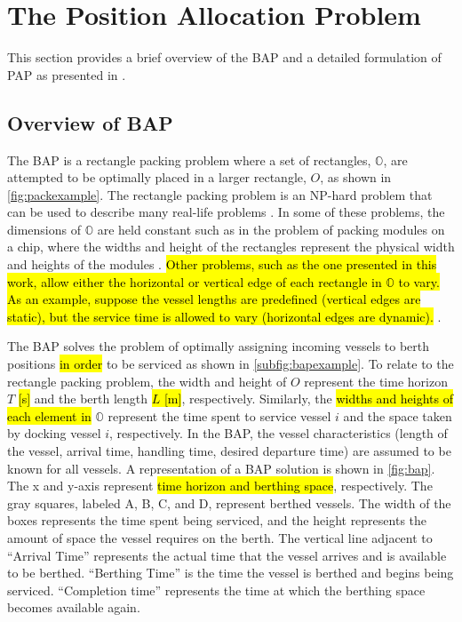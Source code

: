 \documentclass[utf8]{FrontiersinHarvard}
\let\cite\citep                                       %
\begin{document}
\section{The Position Allocation Problem}
\label{sec:the-position-allocation-problem}
This section provides a brief overview of the BAP and a detailed formulation of PAP as presented in
\cite{qarebagh-2019-optim-sched}.

\subsection{Overview of BAP}
\label{sec:overview-of-bap}
The BAP is a rectangle packing problem where a set of rectangles, \(\mathbb{O}\), are attempted to be optimally placed in
a larger rectangle, \(O\), as shown in \autoref{fig:packexample}. The rectangle packing problem is an NP-hard problem that
can be used to describe many real-life problems \cite{bruin-2013-rectan-packin,murata-1995-rectan}. In some of these
problems, the dimensions of \(\mathbb{O}\) are held constant such as in the problem of packing modules on a chip, where
the widths and height of the rectangles represent the physical width and heights of the modules
\cite{murata-1995-rectan}. \hl{Other problems, such as the one presented in this work, allow either the horizontal or vertical edge of each rectangle in $\mathbb{O}$ to vary. As an example, suppose the vessel lengths are predefined (vertical edges are static), but the service time is allowed to vary (horizontal edges are dynamic).}
\cite{buhrkal-2011-model-discr}.

The BAP solves the problem of optimally assigning incoming vessels to berth positions \hl{in order} to be
serviced as shown in \autoref{subfig:bapexample}. To relate to the rectangle packing problem, the width and height of
\(O\) represent the time horizon \(T\) \hl{[s]} and the berth length \hl{$L$ [m]}, respectively. Similarly, the
\hl{widths and heights of each element in} \(\mathbb{O}\) represent the time spent to service vessel \(i\) and
the space taken by docking vessel \(i\), respectively. In the BAP, the vessel characteristics (length of the vessel,
arrival time, handling time, desired departure time) are assumed to be known for all vessels. A representation of a BAP
solution is shown in \autoref{fig:bap}. The x and y-axis represent \hl{time horizon and berthing space}, respectively.
The gray squares, labeled A, B, C, and D, represent berthed vessels. The width of the boxes represents the time spent
being serviced, and the height represents the amount of space the vessel requires on the berth. The vertical line
adjacent to ``Arrival Time'' represents the actual time that the vessel arrives and is available to be berthed.
``Berthing Time'' is the time the vessel is berthed and begins being serviced. ``Completion time'' represents the time
at which the berthing space becomes available again.
\end{document}
